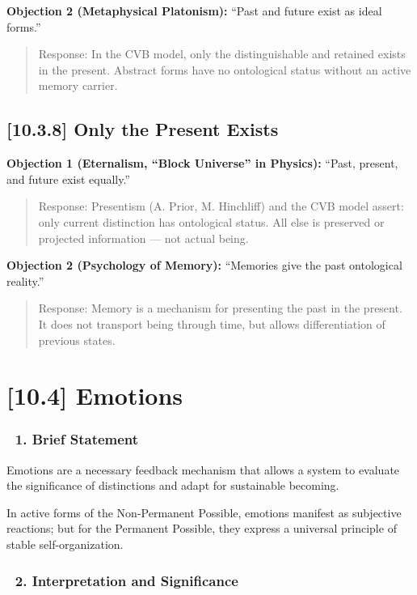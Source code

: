 \documentclass[12pt]{article}
\begin{document}
\textbf{Objection 2 (Metaphysical Platonism):} ``Past and future exist as ideal forms.''

\begin{quote}
Response: In the CVB model, only the distinguishable and retained exists in the present. Abstract forms have no ontological status without an active memory carrier.
\end{quote}

\bigskip
\subsection*{[10.3.8] Only the Present Exists}

\textbf{Objection 1 (Eternalism, ``Block Universe'' in Physics):} ``Past, present, and future exist equally.''

\begin{quote}
Response: Presentism (A. Prior, M. Hinchliff) and the CVB model assert: only current distinction has ontological status. All else is preserved or projected information — not actual being.
\end{quote}

\textbf{Objection 2 (Psychology of Memory):} ``Memories give the past ontological reality.''

\begin{quote}
Response: Memory is a mechanism for presenting the past in the present. It does not transport being through time, but allows differentiation of previous states.
\end{quote}

\section*{[10.4] Emotions}

\subsubsection*{🔹 1. Brief Statement}

Emotions are a necessary feedback mechanism that allows a system to evaluate the significance of distinctions and adapt for sustainable becoming.

In active forms of the Non-Permanent Possible, emotions manifest as subjective reactions; but for the Permanent Possible, they express a universal principle of stable self-organization.

\subsubsection*{🔹 2. Interpretation and Significance}
\end{document}
